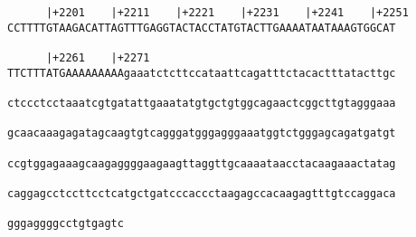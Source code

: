 \documentclass{article}
\begin{document}
\begin{Verbatim}
      |+2201    |+2211    |+2221    |+2231    |+2241    |+2251
CCTTTTGTAAGACATTAGTTTGAGGTACTACCTATGTACTTGAAAATAATAAAGTGGCAT

      |+2261    |+2271                                      
TTCTTTATGAAAAAAAAAgaaatctcttccataattcagatttctacactttatacttgc

ctccctcctaaatcgtgatattgaaatatgtgctgtggcagaactcggcttgtagggaaa

gcaacaaagagatagcaagtgtcagggatgggagggaaatggtctgggagcagatgatgt

ccgtggagaaagcaagaggggaagaagttaggttgcaaaataacctacaagaaactatag

caggagcctccttcctcatgctgatcccaccctaagagccacaagagtttgtccaggaca

gggaggggcctgtgagtc
                  

\end{Verbatim}
\end{document}
